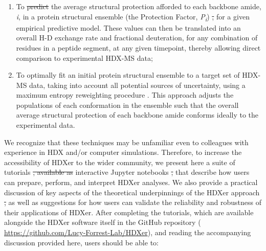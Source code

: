 \documentclass[9pt,tutorial]{livecoms}
\providecommand{\DIFadd}[1]{{\protect\color{blue}\uwave{#1}}} %
\providecommand{\DIFdel}[1]{{\protect\color{red}\sout{#1}}}                      %
\providecommand{\DIFaddbegin}{} %
\providecommand{\DIFaddend}{} %
\providecommand{\DIFdelbegin}{} %
\providecommand{\DIFdelend}{} %
\begin{document}
\begin{enumerate}
\item To \DIFdelbegin \DIFdel{predict }\DIFdelend \DIFaddbegin \DIFadd{compute }\DIFaddend the average structural protection afforded to each backbone amide, \textit{i}, in \DIFaddbegin \DIFadd{each structure of }\DIFaddend a protein structural ensemble (the Protection Factor, \textit{P\textsubscript{i}}) \DIFdelbegin \DIFdel{, }\DIFdelend for a given empirical predictive model. These values can then be translated into an overall H-D exchange rate and fractional deuteration, for any combination of residues in a peptide segment, at any given timepoint, thereby allowing direct comparison to experimental HDX-MS data;

\item To optimally fit an initial protein structural ensemble to a target set of HDX-MS data, taking into account all potential sources of uncertainty, using a maximum entropy reweighting procedure \cite{Pitera2012, Boomsma2014, Marinelli2019}. This approach adjusts the populations of each conformation in the ensemble such that the overall average structural protection of each backbone amide conforms ideally to the experimental data.
\end{enumerate}

We recognize that these techniques may be unfamiliar even to colleagues with experience in HDX and/or computer simulations. 
Therefore, to increase the accessibility of HDXer to the wider community, we present here a suite of tutorials \DIFdelbegin \DIFdel{, available as }\DIFdelend \DIFaddbegin \DIFadd{in the form of }\DIFaddend interactive Jupyter notebooks \DIFdelbegin \DIFdel{, }\DIFdelend that describe how users can prepare, perform, and interpret HDXer analyses. 
We also provide a practical discussion of key aspects of the theoretical underpinnings of the HDXer approach \DIFdelbegin \DIFdel{, }\DIFdelend as well as suggestions for how users can validate the reliability and robustness of their applications of HDXer.
After completing the tutorials, which are available alongside the HDXer software itself in the GitHub repository (\DIFdelbegin %
\DIFdelend \DIFaddbegin \url{https://github.com/Lucy-Forrest-Lab/HDXer}\DIFaddend ), and reading the accompanying discussion provided here, users should be able to:
\end{document}
